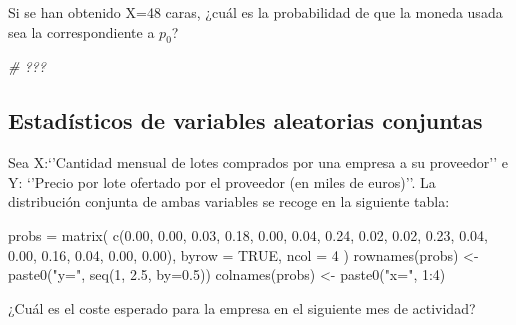 \documentclass[
]{article}
\newenvironment{Shaded}{\begin{snugshade}}{\end{snugshade}}
\newcommand{\AttributeTok}[1]{\textcolor[rgb]{0.77,0.63,0.00}{#1}}
\newcommand{\CommentTok}[1]{\textcolor[rgb]{0.56,0.35,0.01}{\textit{#1}}}
\newcommand{\ConstantTok}[1]{\textcolor[rgb]{0.00,0.00,0.00}{#1}}
\newcommand{\DecValTok}[1]{\textcolor[rgb]{0.00,0.00,0.81}{#1}}
\newcommand{\FloatTok}[1]{\textcolor[rgb]{0.00,0.00,0.81}{#1}}
\newcommand{\FunctionTok}[1]{\textcolor[rgb]{0.00,0.00,0.00}{#1}}
\newcommand{\NormalTok}[1]{#1}
\newcommand{\OtherTok}[1]{\textcolor[rgb]{0.56,0.35,0.01}{#1}}
\newcommand{\SpecialCharTok}[1]{\textcolor[rgb]{0.00,0.00,0.00}{#1}}
\newcommand{\StringTok}[1]{\textcolor[rgb]{0.31,0.60,0.02}{#1}}
\begin{document}
Si se han obtenido X=48 caras, ¿cuál es la probabilidad de que la moneda
usada sea la correspondiente a \(p_0\)?

\begin{Shaded}
\begin{Highlighting}[]
\CommentTok{\# ???}
\end{Highlighting}
\end{Shaded}

\hypertarget{estaduxedsticos-de-variables-aleatorias-conjuntas}{%
\subsection{Estadísticos de variables aleatorias
conjuntas}\label{estaduxedsticos-de-variables-aleatorias-conjuntas}}

Sea X:`'Cantidad mensual de lotes comprados por una empresa a su
proveedor'' e Y: `'Precio por lote ofertado por el proveedor (en miles
de euros)''. La distribución conjunta de ambas variables se recoge en la
siguiente tabla:

\begin{Shaded}
\begin{Highlighting}[]
\NormalTok{probs }\OtherTok{=} \FunctionTok{matrix}\NormalTok{(}
  \FunctionTok{c}\NormalTok{(}\FloatTok{0.00}\NormalTok{, }\FloatTok{0.00}\NormalTok{, }\FloatTok{0.03}\NormalTok{, }\FloatTok{0.18}\NormalTok{,}
    \FloatTok{0.00}\NormalTok{, }\FloatTok{0.04}\NormalTok{, }\FloatTok{0.24}\NormalTok{, }\FloatTok{0.02}\NormalTok{,}
    \FloatTok{0.02}\NormalTok{, }\FloatTok{0.23}\NormalTok{, }\FloatTok{0.04}\NormalTok{, }\FloatTok{0.00}\NormalTok{,}
    \FloatTok{0.16}\NormalTok{, }\FloatTok{0.04}\NormalTok{, }\FloatTok{0.00}\NormalTok{, }\FloatTok{0.00}\NormalTok{),}
  \AttributeTok{byrow =} \ConstantTok{TRUE}\NormalTok{,}
  \AttributeTok{ncol =} \DecValTok{4}
\NormalTok{)}
\FunctionTok{rownames}\NormalTok{(probs) }\OtherTok{\textless{}{-}} \FunctionTok{paste0}\NormalTok{(}\StringTok{"y="}\NormalTok{, }\FunctionTok{seq}\NormalTok{(}\DecValTok{1}\NormalTok{, }\FloatTok{2.5}\NormalTok{, }\AttributeTok{by=}\FloatTok{0.5}\NormalTok{))}
\FunctionTok{colnames}\NormalTok{(probs) }\OtherTok{\textless{}{-}} \FunctionTok{paste0}\NormalTok{(}\StringTok{"x="}\NormalTok{, }\DecValTok{1}\SpecialCharTok{:}\DecValTok{4}\NormalTok{)}
\end{Highlighting}
\end{Shaded}

¿Cuál es el coste esperado para la empresa en el siguiente mes de
actividad?
\end{document}
